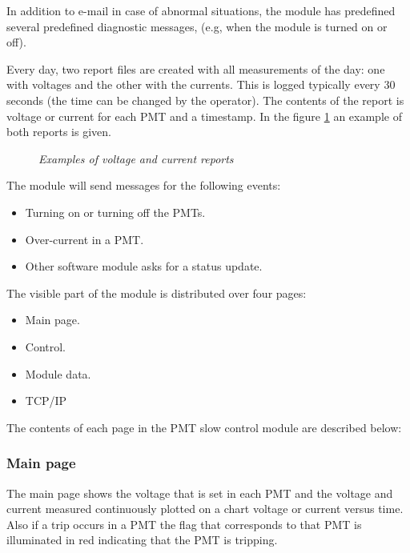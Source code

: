 In addition to e-mail in case of abnormal situations, the module has predefined several predefined diagnostic messages, (e.g, when the module is turned on or off).

Every day, two report files are created with all measurements of the day: one with voltages and the other with the currents. This is logged typically every 30 seconds (the time can be changed by the operator). The contents of the report is voltage or current for each PMT and a timestamp. In the figure  \ref{fig:PMT:REPORT} an example of both reports is given.


\begin{figure}[ht!]
  \centering
  \caption{\textit{Examples of voltage and current reports}}
  \label{fig:PMT:REPORT}
\end{figure}


The module will send messages for the following events:

\begin{itemize}
\item Turning on or turning off the PMTs.
\item Over-current in a PMT.
\item Other software module asks for a status update.
\end{itemize}

\vspace{2cm}

The visible part of the module is distributed over four pages:

\begin{itemize}
\item Main page.
\item Control.
\item Module data.
\item TCP/IP
\end{itemize}

The contents of each page in the PMT slow control module are described below:

\subsubsection*{Main page}

The main page shows the voltage that is set in each PMT and the voltage and current measured continuously plotted on a chart voltage or current versus time. Also if a trip occurs in a PMT the flag that corresponds to that PMT is illuminated in red indicating that the PMT is tripping.

